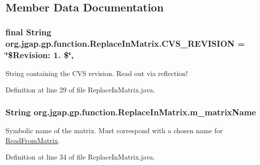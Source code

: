\subsection{Member Data Documentation}
\hypertarget{classorg_1_1jgap_1_1gp_1_1function_1_1_replace_in_matrix_aad4cd9e908d09f1fa23ab9f69cd082dc}{
\subsubsection[{C\-V\-S\-\_\-\-R\-E\-V\-I\-S\-I\-O\-N}]{\setlength{\rightskip}{0pt plus 5cm}final String org.\-jgap.\-gp.\-function.\-Replace\-In\-Matrix.\-C\-V\-S\-\_\-\-R\-E\-V\-I\-S\-I\-O\-N = \char`\"{}\$Revision\-: 1. \$\char`\"{}\hspace{0.3cm}{\ttfamily [static]}, {\ttfamily [private]}}}\label{classorg_1_1jgap_1_1gp_1_1function_1_1_replace_in_matrix_aad4cd9e908d09f1fa23ab9f69cd082dc}
String containing the C\-V\-S revision. Read out via reflection! 

Definition at line 29 of file Replace\-In\-Matrix.\-java.

\hypertarget{classorg_1_1jgap_1_1gp_1_1function_1_1_replace_in_matrix_a7d4faa65d6b6b40b875647a609882f63}{
\subsubsection[{m\-\_\-matrix\-Name}]{\setlength{\rightskip}{0pt plus 5cm}String org.\-jgap.\-gp.\-function.\-Replace\-In\-Matrix.\-m\-\_\-matrix\-Name\hspace{0.3cm}{\ttfamily [private]}}}\label{classorg_1_1jgap_1_1gp_1_1function_1_1_replace_in_matrix_a7d4faa65d6b6b40b875647a609882f63}
Symbolic name of the matrix. Must correspond with a chosen name for \hyperlink{classorg_1_1jgap_1_1gp_1_1function_1_1_read_from_matrix}{Read\-From\-Matrix}. 

Definition at line 34 of file Replace\-In\-Matrix.\-java.

